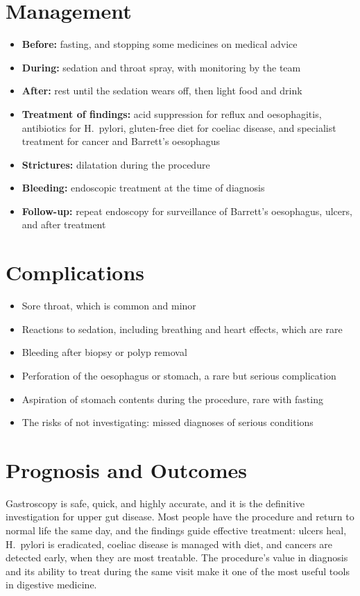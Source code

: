 \section*{Management}
\begin{itemize}
    \item \textbf{Before:} fasting, and stopping some medicines on medical advice
    \item \textbf{During:} sedation and throat spray, with monitoring by the team
    \item \textbf{After:} rest until the sedation wears off, then light food and drink
    \item \textbf{Treatment of findings:} acid suppression for reflux and oesophagitis, antibiotics for H.\ pylori, gluten-free diet for coeliac disease, and specialist treatment for cancer and Barrett's oesophagus
    \item \textbf{Strictures:} dilatation during the procedure
    \item \textbf{Bleeding:} endoscopic treatment at the time of diagnosis
    \item \textbf{Follow-up:} repeat endoscopy for surveillance of Barrett's oesophagus, ulcers, and after treatment
\end{itemize}

\section*{Complications}
\begin{itemize}
    \item Sore throat, which is common and minor
    \item Reactions to sedation, including breathing and heart effects, which are rare
    \item Bleeding after biopsy or polyp removal
    \item Perforation of the oesophagus or stomach, a rare but serious complication
    \item Aspiration of stomach contents during the procedure, rare with fasting
    \item The risks of not investigating: missed diagnoses of serious conditions
\end{itemize}

\section*{Prognosis and Outcomes}
Gastroscopy is safe, quick, and highly accurate, and it is the definitive investigation for upper gut disease. Most people have the procedure and return to normal life the same day, and the findings guide effective treatment: ulcers heal, H.\ pylori is eradicated, coeliac disease is managed with diet, and cancers are detected early, when they are most treatable. The procedure's value in diagnosis and its ability to treat during the same visit make it one of the most useful tools in digestive medicine.

